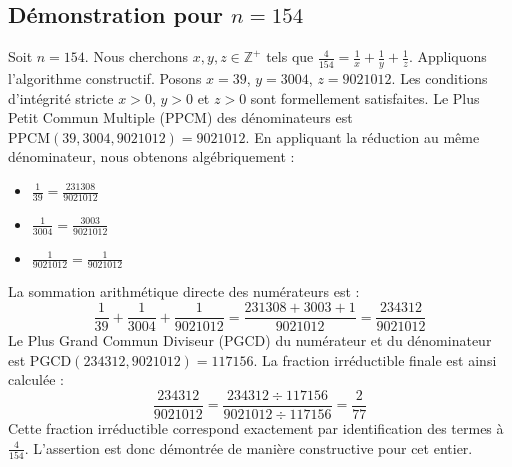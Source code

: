 \documentclass[11pt,a4paper]{article}
\begin{document}
\subsection{Démonstration pour $n = 154$}
Soit $n = 154$. Nous cherchons $x, y, z \in \mathbb{Z}^{+}$ tels que $\frac{4}{154} = \frac{1}{x} + \frac{1}{y} + \frac{1}{z}$.
Appliquons l'algorithme constructif. Posons $x = 39$, $y = 3004$, $z = 9021012$.
Les conditions d'intégrité stricte $x > 0$, $y > 0$ et $z > 0$ sont formellement satisfaites.
Le Plus Petit Commun Multiple (PPCM) des dénominateurs est $\text{PPCM}(39, 3004, 9021012) = 9021012$.
En appliquant la réduction au même dénominateur, nous obtenons algébriquement :
\begin{itemize}
    \item $\frac{1}{39} = \frac{231308}{9021012}$
    \item $\frac{1}{3004} = \frac{3003}{9021012}$
    \item $\frac{1}{9021012} = \frac{1}{9021012}$
\end{itemize}
La sommation arithmétique directe des numérateurs est :
$$ \frac{1}{39} + \frac{1}{3004} + \frac{1}{9021012} = \frac{231308 + 3003 + 1}{9021012} = \frac{234312}{9021012} $$
Le Plus Grand Commun Diviseur (PGCD) du numérateur et du dénominateur est $\text{PGCD}(234312, 9021012) = 117156$.
La fraction irréductible finale est ainsi calculée :
$$ \frac{234312}{9021012} = \frac{234312 \div 117156}{9021012 \div 117156} = \frac{2}{77} $$
Cette fraction irréductible correspond exactement par identification des termes à $\frac{4}{154}$. L'assertion est donc démontrée de manière constructive pour cet entier.
\end{document}
